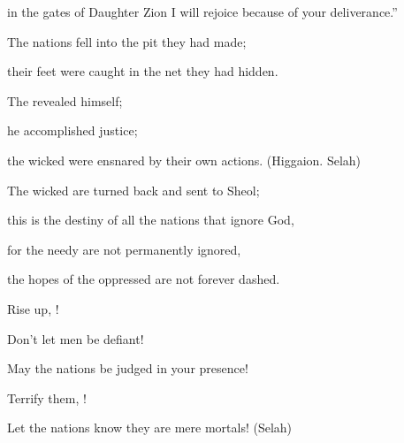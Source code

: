 {\par }{\Q in the gates
of Daughter
Zion
I will rejoice
because of your deliverance.”
\par }{\Q {}The nations
fell
into the pit
they had made;
\par }{\Q their feet
were caught
in the net
they had hidden.
\par }{\Q {}The
{}
revealed
himself;
\par }{\Q he accomplished
justice;
\par }{\Q the wicked
were ensnared
by their own actions. (Higgaion.
Selah)
\par }{\Q {}The wicked
are turned back
and sent to Sheol;
\par }{\Q this is the destiny of all
the nations
that ignore
God,
\par }{\Q {}for
the needy
are not
permanently
ignored,
\par }{\Q the hopes
of the oppressed
are not forever
dashed.
\par }{\Q {}Rise
up,
{}!

\par }{\Q Don’t
let men
be defiant!

\par }{\Q May
the nations
be judged
in your presence!
\par }{\Q {}Terrify
them,
{}!

\par }{\Q Let the nations
know
they
are
mere
mortals! (Selah)


\par }
